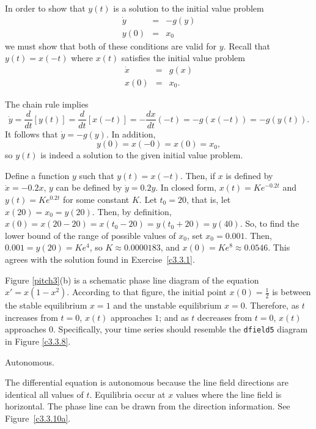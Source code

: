 \documentclass{ximera}
\begin{document}
In order to show that $y(t)$ is a solution to the initial value problem
\[
\begin{array}{rcl}
\dot{y} & = & -g(y) \\
y(0) & = & x_0\end{array}
\]
we must show that both of these conditions are valid for $y$.  Recall that
$y(t) = x(-t)$ where $x(t)$ satisfies the initial value problem
\[ \begin{array}{rcl}
\dot{x} & = & g(x) \\
x(0) & = & x_0.\end{array} \]

The chain rule implies
\[ \dot{y} = \frac{d}{dt}[y(t)] = \frac{d}{dt}[x(-t)] =
-\frac{dx}{dt}(-t) = -g(x(-t)) = -g(y(t)). \]
It follows that $\dot y = -g(y)$.
In addition,
\[ y(0) = x(-0) = x(0) = x_0, \]
so $y(t)$ is indeed a solution to the given initial value problem.

Define a function $y$ such that $y(t) = x(-t)$.  Then, if $x$ is defined by
$\dot{x} = -0.2x$, $y$ can be defined by $\dot{y} = 0.2y$.  In closed form,
$x(t) = Ke^{-0.2t}$ and $y(t) = Ke^{0.2t}$ for some constant $K$.  Let $t_0
= 20$, that is, let $x(20) = x_0 = y(20)$.  Then, by definition,
$x(0) = x(20 - 20) = x(t_0 - 20) = y(t_0 + 20) = y(40)$.  So, to find the
lower bound of the range of possible values of $x_0$, set $x_0 = 0.001$.
Then, $0.001 = y(20) = Ke^4$, so $K \approx 0.0000183$, and $x(0) = Ke^8
\approx 0.0546$.  This agrees with the solution found in
Exercise~\ref{c3.3.1}.

\newpage
{}
Figure \ref{pitch3}(b) is a schematic
phase line diagram of the equation $x' = x(1 - x^2)$.  According
to that figure, the initial point $x(0) = \frac{1}{2}$ is between
the stable equilibrium $x = 1$ and the unstable equilibrium
$x = 0$.  Therefore, as $t$ increases from $t = 0$, $x(t)$
approaches $1$; and as $t$ decreases from $t = 0$, $x(t)$
approaches $0$.  Specifically, your time series should resemble
the {\tt dfield5} diagram in Figure \ref{c3.3.8}.

\begin{figure}[htb]
                       \centerline{%
                       }
\end{figure}

 \ans Autonomous.

\soln  The differential equation is autonomous because the line field 
directions are identical all values of $t$.  Equilibria occur at $x$ values 
where the line field is horizontal.  The phase line can be drawn from the 
direction information.  See Figure~\ref{c3.3.10a}.
\end{document}
